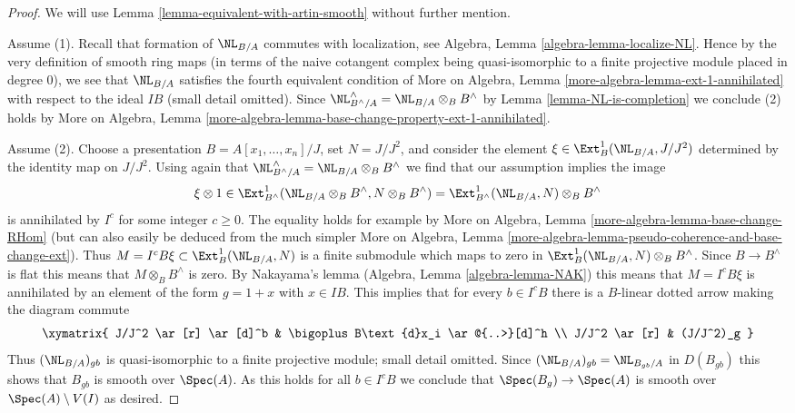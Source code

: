 \begin{proof}
We will use Lemma \ref{lemma-equivalent-with-artin-smooth}
without further mention.

\medskip\noindent
Assume (1). Recall that formation of $\NL_{B/A}$ commutes with
localization, see Algebra, Lemma \ref{algebra-lemma-localize-NL}.
Hence by the very definition of smooth ring maps (in terms of
the naive cotangent complex being quasi-isomorphic to a finite
projective module placed in degree $0$), we see that
$\NL_{B/A}$ satisfies the fourth equivalent condition
of More on Algebra, Lemma \ref{more-algebra-lemma-ext-1-annihilated}
with respect to the ideal $IB$ (small detail omitted).
Since $\NL_{B^\wedge/A}^\wedge = \NL_{B/A} \otimes_B B^\wedge$
by Lemma \ref{lemma-NL-is-completion} we conclude (2) holds by
More on Algebra, Lemma
\ref{more-algebra-lemma-base-change-property-ext-1-annihilated}.

\medskip\noindent
Assume (2). Choose a presentation
$B = A[x_1, \ldots, x_n]/J$, set $N = J/J^2$, and
consider the element $\xi \in \Ext^1_B(\NL_{B/A}, J/J^2)$
determined by the identity map on $J/J^2$.
Using again that $\NL_{B^\wedge/A}^\wedge = \NL_{B/A} \otimes_B B^\wedge$
we find that our assumption implies the image
$$
\xi \otimes 1 \in
\Ext^1_{B^\wedge}(\NL_{B/A} \otimes_B B^\wedge, N \otimes_B B^\wedge) =
\Ext^1_{B^\wedge}(\NL_{B/A}, N) \otimes_B B^\wedge
$$
is annihilated by $I^c$ for some integer $c \geq 0$.
The equality holds for example by
More on Algebra, Lemma \ref{more-algebra-lemma-base-change-RHom}
(but can also easily be deduced from the much simpler
More on Algebra, Lemma
\ref{more-algebra-lemma-pseudo-coherence-and-base-change-ext}).
Thus $M = I^cB\xi \subset \Ext^1_B(\NL_{B/A}, N)$ is a finite submodule
which maps to zero in $\Ext^1_B(\NL_{B/A}, N) \otimes_B B^\wedge$.
Since $B \to B^\wedge$ is flat this means that
$M \otimes_B B^\wedge$ is zero. By 
Nakayama's lemma (Algebra, Lemma \ref{algebra-lemma-NAK})
this means that $M = I^cB\xi$ is annihilated by an element
of the form $g = 1 + x$ with $x \in IB$.
This implies that for every $b \in I^cB$ there is a
$B$-linear dotted arrow making the diagram commute
$$
\xymatrix{
J/J^2 \ar[r] \ar[d]^b & \bigoplus B\text{d}x_i \ar@{..>}[d]^h \\
J/J^2 \ar[r] & (J/J^2)_g
}
$$
Thus $(\NL_{B/A})_{gb}$ is quasi-isomorphic
to a finite projective module; small detail omitted.
Since $(\NL_{B/A})_{gb} = \NL_{B_{gb}/A}$ in $D(B_{gb})$
this shows that $B_{gb}$ is smooth over $\Spec(A)$.
As this holds for all $b \in I^cB$ we conclude
that $\Spec(B_g) \to \Spec(A)$ is smooth over $\Spec(A) \setminus V(I)$
as desired.
\end{proof}













